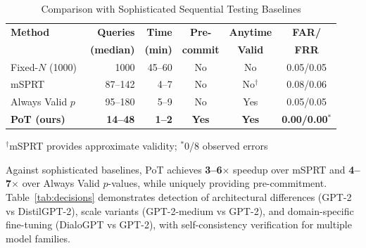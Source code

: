 \documentclass[11pt]{article}
\begin{document}
\begin{table}[ht!]
\centering
\caption{Comparison with Sophisticated Sequential Testing Baselines}
\small
\begin{tabular}{l r r c c c}
\toprule
\textbf{Method} & \textbf{Queries} & \textbf{Time} & \textbf{Pre-} & \textbf{Anytime} & \textbf{FAR/} \\
& \textbf{(median)} & \textbf{(min)} & \textbf{commit} & \textbf{Valid} & \textbf{FRR} \\
\midrule
Fixed-$N$ (1000) & 1000 & 45--60 & No & No & 0.05/0.05 \\
mSPRT~\cite{johari2017peeking} & 87--142 & 4--7 & No & No$^{\dagger}$ & 0.08/0.06 \\
Always Valid $p$~\cite{ramdas2023gametheoretic} & 95--180 & 5--9 & No & Yes & 0.05/0.05 \\
\textbf{PoT (ours)} & \textbf{14--48} & \textbf{1--2} & \textbf{Yes} & \textbf{Yes} & \textbf{0.00/0.00}$^*$ \\
\bottomrule
\end{tabular}

\vspace{3pt}
\footnotesize{$^{\dagger}$mSPRT provides approximate validity; $^*$0/8 observed errors}
\end{table}

Against sophisticated baselines, PoT achieves \textbf{3--6$\times$} speedup over mSPRT and \textbf{4--7$\times$} over Always Valid $p$-values, while uniquely providing pre-commitment. Table~\ref{tab:decisions} demonstrates detection of architectural differences (GPT-2 vs DistilGPT-2), scale variants (GPT-2-medium vs GPT-2), and domain-specific fine-tuning (DialoGPT vs GPT-2), with self-consistency verification for multiple model families.
\end{document}
